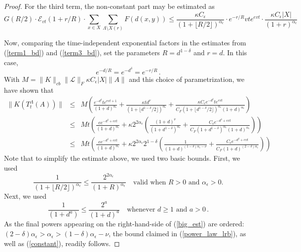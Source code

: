 \documentclass[10pt,a4paper]{amsart}
\numberwithin{equation}{section}
\newcommand{\E}{\mathscr{E}}
\begin{document}
\begin{proof}
For the third term, the non-constant part may be estimated as
\begin{equation} \label{term3_bd}
G(R/2) \cdot \E_{vt}(1+r/R) \cdot \sum_{x \in X} \sum_{\Lambda \setminus X(r)} F(d(x,y)) \leq \frac{\kappa C_{\epsilon}}{(1+ \lfloor R/2 \rfloor)^{\alpha_\epsilon}} \cdot
e^{- r/R} v t e^{evt} \cdot \frac{ \kappa C_{\epsilon} |X|}{(1+r)^{\alpha_\epsilon}}
\end{equation}

Now, comparing the time-independent exponential factors in the estimates from (\ref{term1_bd}) and (\ref{term3_bd}), set the 
parameters $R = d^{1- \delta}$ and $r = d$.  
In this case,
\begin{equation}
e^{- d/R} = e^{-d^{\delta}} = e^{-r/R}\, .
\end{equation}
With $M = \| K \|_{cb}\| \mathscr{L} \|_F \kappa C_{\epsilon}  |X| \| A \|$ and this choice of parametrization, we have shown that
\begin{eqnarray} \label{big_est}
\| K(T_t^{\Lambda}(A)) \| & \leq & M \left( \frac{e^{- d^{\delta}} t e^{evt+1}}{(1+d)^{\alpha_{\epsilon}}} 
+  \frac{\kappa t d^{\nu}}{(1+ \lfloor d^{1- \delta}/2 \rfloor)^{\alpha_\epsilon}} + \frac{\kappa C_{\epsilon} e^{- d^{\delta}} t e^{evt}}{ C_F(1+ \lfloor d^{1- \delta}/2 \rfloor)^{\alpha_{\epsilon}} (1+d)^{\alpha_{\epsilon}}}  \right) \nonumber \\
& \leq & M t \left( \frac{e e^{- d^{\delta} +evt}}{(1+d)^{\alpha_{\epsilon}}} 
+ \kappa 2^{2 \alpha_{\epsilon}} \left( \frac{(1+d)^{\nu}}{(1+ d^{1- \delta})^{\alpha_\epsilon}} + \frac{C_{\epsilon} e^{- d^{\delta} +evt}}{ C_F (1+  d^{1- \delta})^{\alpha_{\epsilon}} (1+d)^{\alpha_{\epsilon}}} \right) \right) \nonumber \\
& \leq & M t \left( \frac{e e^{- d^{\delta} +evt }}{(1+d)^{\alpha_{\epsilon}}} 
+ \kappa 2^{2 \alpha_{\epsilon}} 2^{1- \delta} \left( \frac{1 }{(1+ d)^{(1- \delta)\alpha_\epsilon - \nu}} + \frac{C_{\epsilon} e^{- d^{\delta} +evt}}{ C_F(1+d)^{(2-\delta) \alpha_{\epsilon}}} \right) \right)
\end{eqnarray}
Note that to simplify the estimate above, we used two basic bounds. First, we used
\begin{equation}
\frac{1}{(1+ \lfloor R/2 \rfloor)^{\alpha_{\epsilon}}} \leq \frac{2^{2 \alpha_{\epsilon}}}{(1+R)^{\alpha_{\epsilon}}} \quad \mbox{valid when } R>0 \mbox{ and } \alpha_{\epsilon} >0. 
\end{equation}
Next, we used
\begin{equation}
\frac{1}{(1+d^{a})} \leq \frac{2^{a}}{(1+d)^{a}} \quad \mbox{whenever } d \geq 1 \mbox{ and } a >0 \, .
\end{equation}
As the final powers appearing on the right-hand-side of (\ref{big_est}) are ordered: $(2 - \delta) \alpha_{\epsilon} > \alpha_{\epsilon} > (1- \delta) \alpha_{\epsilon} - \nu$, the bound
claimed in (\ref{power_law_lrb}), as well as (\ref{constant}), readily follows. 
\end{proof}
\end{document}
